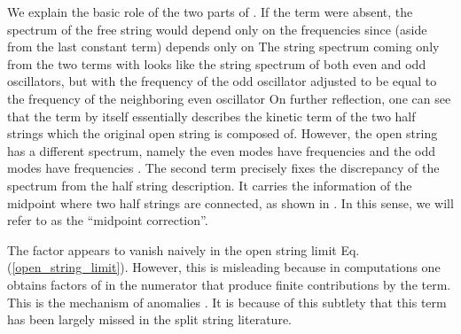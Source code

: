\documentclass[a4paper,aps,preprint,nofootinbib,eqsecnum]{revtex4}
\begin{document}
We explain the basic role of the two parts of \coordHE{}. If the \myHighlight{$\gamma $}\coordHE{} term
were absent, the spectrum of the free string would depend only on the
frequencies \coordHE{} since \coordHE{} (aside from the last
constant term) depends only on \coordHE{} The string spectrum coming
only from the two terms with \coordHE{} looks like the string
spectrum of both even and odd oscillators, but with the frequency of the odd
oscillator \coordHE{} adjusted to be equal to the frequency of the
neighboring even oscillator \coordHE{} On further reflection, one can see that the \coordHE{} term
by itself essentially describes the kinetic term of the two half strings
which the original open string is composed of. However, the open string has
a different spectrum, namely the even modes have frequencies \coordHE{}
and the odd modes have frequencies \coordHE{}. The second term \myHighlight{$\gamma $}\coordHE{}
precisely fixes the discrepancy of the spectrum from the half string
description. It carries the information of the midpoint where two half
strings are connected, as shown in \cite{BM2}\cite{BKM1}. In this sense, we
will refer to \myHighlight{$\gamma $}\coordHE{} as the \textquotedblleft midpoint
correction\textquotedblright .

The factor \coordHE{} appears to vanish naively in the open string
limit Eq.(\ref{open_string_limit}). However, this is misleading because in
computations one obtains factors of \coordHE{} in the numerator that produce
finite contributions by the \myHighlight{$\gamma $}\coordHE{} term. This is the mechanism of
anomalies \cite{BM1}. It is because of this subtlety that this term has been
largely missed in the split string literature.
\end{document}
